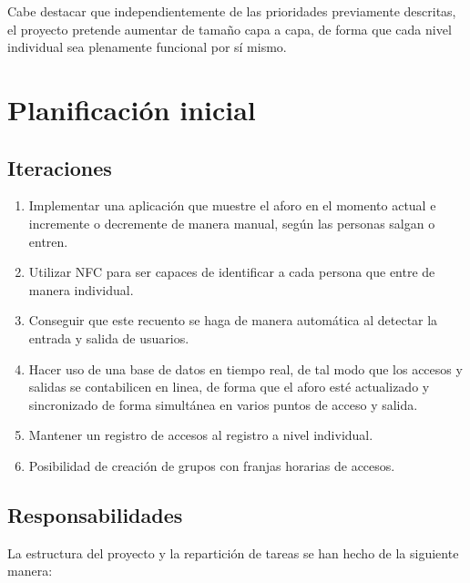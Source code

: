 \documentclass[a4paper,openright,12pt]{article}
\begin{document}
Cabe destacar que independientemente de las prioridades previamente descritas, el proyecto pretende aumentar de tamaño capa a capa, de forma que cada nivel individual sea plenamente funcional por sí mismo.
\section{Planificación inicial}

\subsection{Iteraciones}
\begin{enumerate}
    \item Implementar una aplicación que muestre el aforo en el momento actual e incremente o decremente de manera manual, según las personas salgan o entren.
    \item Utilizar NFC \cite{NFC} para ser capaces de identificar a cada persona que entre de manera individual.
    \item Conseguir que este recuento se haga de manera automática al detectar la entrada y salida de usuarios.
    \item Hacer uso de una base de datos en tiempo real, de tal modo que los accesos y salidas se contabilicen en linea, de forma que el aforo esté actualizado y sincronizado de forma simultánea en varios puntos de acceso y salida. 
    \item Mantener un registro de accesos al registro a nivel individual.
    \item Posibilidad de creación de grupos con franjas horarias de accesos.
\end{enumerate}

\subsection{Responsabilidades}
La estructura del proyecto y la repartición de tareas se han hecho de la siguiente manera:
\end{document}
